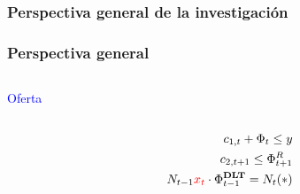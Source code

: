 \subsubsection{Perspectiva general de la investigación}

\begin{frame}
\frametitle{Perspectiva general}
\begin{columns}

    \begin{column}{0.50\textwidth}
    \vspace{-5pt}
    \begin{block}{\textcolor{blue}{Oferta}}
        \begin{column}{0.1\textwidth}
        \vspace{-10pt} %
            \tiny
            \begin{align*}
            c_{1,t}+\Phi_t \le y\\
            c_{2,t+1}\le\Phi_{t+1}^R\\
            N_{t-1}\textcolor{red}{x_t} \cdot \Phi_{t-1}^{\textbf{DLT}}=N_t(*)
            \end{align*}
        \end{column}
        \begin{column}{0.35\textwidth}  
            \begin{figure}[H]
            \begin{center}

\end{center}
\end{figure}
\end{column}
\end{block}
\end{column}
\end{columns}
\end{frame}

